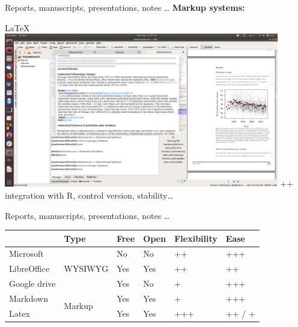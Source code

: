 \documentclass[10pt]{beamer}%
\begin{document}
\begin{frame}{Reports, manuscripts, presentations, notes \dots}
\textbf{\Large Markup systems:}

    {    \centering \Large \alert{ \LaTeX }\\
        
        \includegraphics[width=0.9\textwidth]{Figures/latex}
    }
++ integration with R, control version, stability\dots 
\end{frame}

\begin{frame}{Reports, manuscripts, presentations, notes \dots}
\begin{center}
\begin{tabular}{llllll}
 &  Type & Free & Open &  Flexibility& Ease \\
 \hline
 Microsoft & \multirow{3}{*}{WYSIWYG} & No & No & ++ & +++\\
LibreOffice & & Yes & Yes & ++ &  ++\\
Google drive & & Yes & No & + &  +++\\
\cline{2-6}
Markdown & \multirow{2}{*}{Markup} &  Yes & Yes & +  & +++\\
Latex &  & Yes & Yes & +++ & ++ / +\\
\hline
\end{tabular}
\end{center}



\end{frame}
\end{document}

